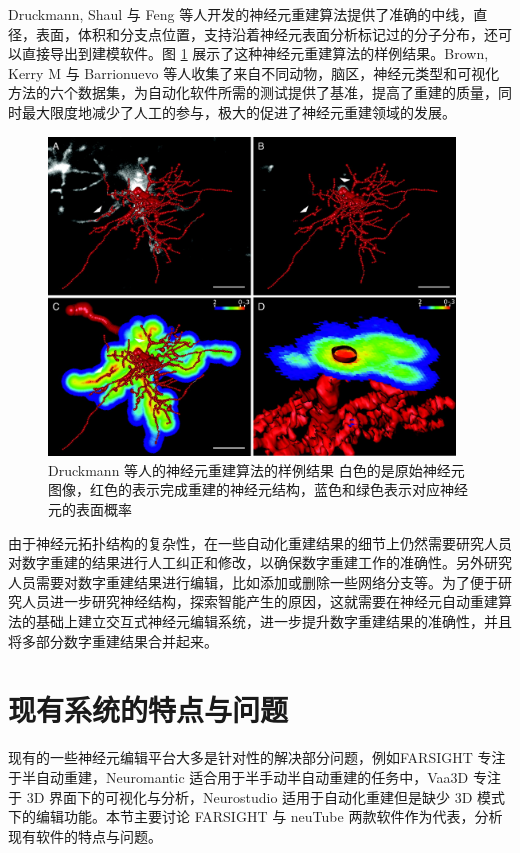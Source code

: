 Druckmann, Shaul 与 Feng 等人开发的神经元重建算法提供了准确的中线，直径，表面，体积和分支点位置，支持沿着神经元表面分析标记过的分子分布，还可以直接导出到建模软件。图 \ref{Druckmann} 展示了这种神经元重建算法的样例结果。Brown, Kerry M 与 Barrionuevo 等人收集了来自不同动物，脑区，神经元类型和可视化方法的六个数据集，为自动化软件所需的测试提供了基准，提高了重建的质量，同时最大限度地减少了人工的参与，极大的促进了神经元重建领域的发展。

\begin{figure}[!ht]
\centering
\includegraphics[width=108mm]{images/Druckmann}
\caption{Druckmann 等人的神经元重建算法的样例结果 白色的是原始神经元图像，红色的表示完成重建的神经元结构，蓝色和绿色表示对应神经元的表面概率}
\label{Druckmann}
\end{figure}

由于神经元拓扑结构的复杂性，在一些自动化重建结果的细节上仍然需要研究人员对数字重建的结果进行人工纠正和修改，以确保数字重建工作的准确性。另外研究人员需要对数字重建结果进行编辑，比如添加或删除一些网络分支等。为了便于研究人员进一步研究神经结构，探索智能产生的原因，这就需要在神经元自动重建算法的基础上建立交互式神经元编辑系统，进一步提升数字重建结果的准确性，并且将多部分数字重建结果合并起来。

\section{现有系统的特点与问题}
现有的一些神经元编辑平台大多是针对性的解决部分问题，例如FARSIGHT  专注于半自动重建，Neuromantic  适合用于半手动半自动重建的任务中，Vaa3D  专注于 3D 界面下的可视化与分析，Neurostudio  适用于自动化重建但是缺少 3D 模式下的编辑功能。本节主要讨论 FARSIGHT  与 neuTube  两款软件作为代表，分析现有软件的特点与问题。

